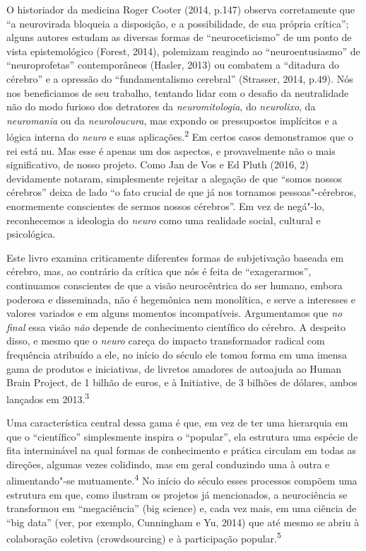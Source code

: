 O historiador da medicina Roger Cooter (2014, p.147) observa
corretamente que ``a neurovirada bloqueia a disposição, e a
possibilidade, de sua própria crítica''; alguns autores estudam as
diversas formas de ``neuroceticismo'' de um ponto de vista
epistemológico (Forest, 2014), polemizam reagindo ao ``neuroentusiasmo''
de ``neuroprofetas'' contemporâneos (Hasler, 2013) ou combatem a
``ditadura do cérebro'' e a opressão do ``fundamentalismo cerebral''
(Strasser, 2014, p.49). Nós nos beneficiamos de seu trabalho, tentando
lidar com o desafio da neutralidade não do modo furioso dos detratores
da \emph{neuromitologia}, do \emph{neurolixo}, da \emph{neuromania} ou
da \emph{neuroloucura}, mas expondo os pressupostos implícitos e a
lógica interna do \emph{neuro} e suas aplicações.\textsuperscript{2} Em
certos casos demonstramos que o rei está nu. Mas esse é apenas um dos
aspectos, e provavelmente não o mais significativo, de nosso projeto.
Como Jan de Vos e Ed Pluth (2016, 2) devidamente notaram, simplesmente
rejeitar a alegação de que ``somos nossos cérebros'' deixa de lado ``o
fato crucial de que já nos tornamos pessoas"-cérebros, enormemente
conscientes de sermos nossos cérebros''. Em vez de negá"-lo, reconhecemos
a ideologia do \emph{neuro} como uma realidade social, cultural e
psicológica.

Este livro examina criticamente diferentes formas de subjetivação
baseada em cérebro, mas, ao contrário da crítica que nós é feita de
``exagerarmos'', continuamos conscientes de que a visão neurocêntrica do
ser humano, embora poderosa e disseminada, não é hegemônica nem
monolítica, e serve a interesses e valores variados e em alguns momentos
incompatíveis. Argumentamos que \emph{no final} essa visão \emph{não}
depende de conhecimento científico do cérebro. A despeito disso, e mesmo
que o \emph{neuro} careça do impacto transformador radical com
frequência atribuído a ele, no início do século  ele tomou forma em
uma imensa gama de produtos e iniciativas, de livretos amadores de
autoajuda ao Human Brain Project, de 1 bilhão de euros, e à 
Initiative, de 3 bilhões de dólares, ambos lançados em
2013.\textsuperscript{3}

Uma característica central dessa gama é que, em vez de ter uma
hierarquia em que o ``científico'' simplesmente inspira o ``popular'',
ela estrutura uma espécie de fita interminável na qual formas de
conhecimento e prática circulam em todas as direções, algumas vezes
colidindo, mas em geral conduzindo uma à outra e alimentando"-se
mutuamente.\textsuperscript{4} No início do século  esses processos
compõem uma estrutura em que, como ilustram os projetos já mencionados,
a neurociência se transformou em ``megaciência'' (big science) e, cada
vez mais, em uma ciência de ``big data'' (ver, por exemplo, Cunningham e
Yu, 2014) que até mesmo se abriu à colaboração coletiva (crowdsourcing)
e à participação popular.\textsuperscript{5}

